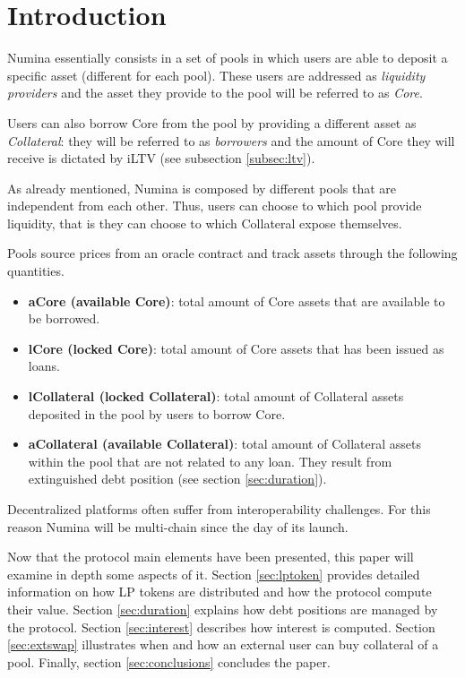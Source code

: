 \documentclass[12pt]{paper}
\begin{document}
\section{Introduction}
\label{sec:introduction}
	Numina essentially consists in a set of pools in which users are able to deposit a specific asset (different for each pool). These users are addressed as \textit{liquidity providers} and the asset they provide to the pool will be referred to as \textit{Core}.
	\par Users can also borrow Core from the pool by providing a different asset as \textit{Collateral}: they will be referred to as \textit{borrowers} and the amount of Core they will receive is dictated by iLTV (see subsection \ref{subsec:ltv}).
	\par As already mentioned, Numina is composed by different pools that are independent from each other. Thus, users can choose to which pool provide liquidity, that is they can choose to which Collateral expose themselves.
	\par Pools source prices from an oracle contract and track assets through the following quantities.
	\begin{itemize}
		\item \textbf{aCore (available Core)}: total amount of Core assets that are available to be borrowed.
		\item \textbf{lCore (locked Core)}: total amount of Core assets that has been issued as loans.
		\item \textbf{lCollateral (locked Collateral)}: total amount of Collateral assets deposited in the pool by users to borrow Core.
		\item \textbf{aCollateral (available Collateral)}: total amount of Collateral assets within the pool that are not related to any loan. They result from extinguished debt position (see section \ref{sec:duration}).
	\end{itemize}
	Decentralized platforms often suffer from interoperability challenges. For this reason Numina will be multi-chain since the day of its launch.
	\par Now that the protocol main elements have been presented, this paper will examine in depth some aspects of it. Section \ref{sec:lptoken} provides detailed information on how LP tokens are distributed and how the protocol compute their value. Section \ref{sec:duration} explains how debt positions are managed by the protocol. Section \ref{sec:interest} describes how interest is computed. Section \ref{sec:extswap} illustrates when and how an external user can buy collateral of a pool. Finally, section \ref{sec:conclusions} concludes the paper. 
	
\end{document}
